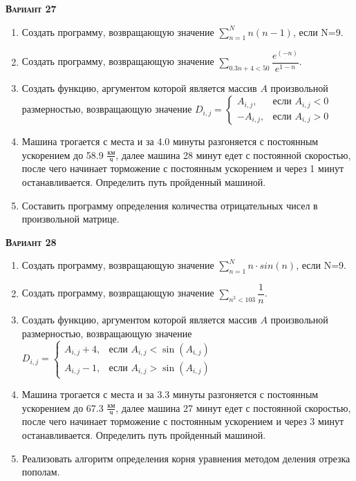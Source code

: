 \textsc{\textbf{Вариант 27}}
\begin{enumerate}
\item  Создать программу, возвращающую значение $\sum\limits_{n=1}^{N} {n (n-1)}                     $, если N=9. 
\item  Создать программу, возвращающую значение $\sum\limits_{0.3n+4<   50} \dfrac{e^(-n)}{e^{1-n}}       $. 
\item Создать функцию, аргументом которой является массив $A$ произвольной размерностью, возвращающую значение $D_{i,j}=\begin{cases} A_{i,j}, & \text{если } A_{i,j}<0 \\ -A_{i,j}, & \text{если } A_{i,j}>0 \end{cases}                                    $ 
\item Машина трогается с места и за  4.0 минуты разгоняется с постоянным ускорением до 58.9 ${\frac{км}{ч}}$, далее машина   28 минут едет с постоянной скоростью, после чего начинает торможение с постоянным ускорением и через   1 минут останавливается. Определить путь пройденный машиной.  \item Составить программу определения количества отрицательных чисел в произвольной матрице.                                                                                                                                                                                    

\end{enumerate}
\textsc{\textbf{Вариант 28}}
\begin{enumerate}
\item  Создать программу, возвращающую значение $\sum\limits_{n=1}^{N} n \cdot sin(n)                $, если N=9. 
\item  Создать программу, возвращающую значение $\sum\limits_{n^2<     103} {\dfrac{1}{n} }               $. 
\item Создать функцию, аргументом которой является массив $A$ произвольной размерностью, возвращающую значение $D_{i,j}=\begin{cases} A_{i,j}+4, & \text{если } {A_{i,j}}<\sin(A_{i,j}) \\  A_{i,j}-1, & \text{если } {A_{i,j}}>\sin(A_{i,j}) \end{cases}    $ 
\item Машина трогается с места и за  3.3 минуты разгоняется с постоянным ускорением до 67.3 ${\frac{км}{ч}}$, далее машина   27 минут едет с постоянной скоростью, после чего начинает торможение с постоянным ускорением и через   3 минут останавливается. Определить путь пройденный машиной.  \item Реализовать алгоритм определения корня уравнения методом деления отрезка пополам.                                                                                                                                                                                              

\end{enumerate}
